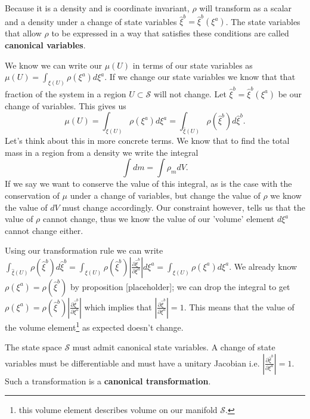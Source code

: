 \documentclass{article}
\begin{document}

\begin{prop}
	Because it is a density and is coordinate invariant, $\rho$ will transform as a scalar and a density under a change of state variables $\hat{\xi}^b = \hat{\xi}^b(\xi^a)$. The state variables that allow $\rho$ to be expressed in a way that satisfies these conditions are called \textbf{canonical variables}.
\end{prop}


	We know we can write our $\mu(U)$ in terms of our state variables as $\mu(U) = \int_{\xi(U)} \rho(\xi^a)d\xi^a$. If we change our state variables we know that that fraction of the system in a region $U \subset \mathcal{S}$ will not change. Let $\hat{\xi}^b = \hat{\xi}^b(\xi^a)$ be our change of variables. This gives us $$\mu(U) = \int_{\xi(U)} \rho(\xi^a)d\xi^a = \int_{\hat{\xi}(U)} \rho(\hat{\xi}^b)d\hat{\xi}^b.$$ Let's think about this in more concrete terms. We know that to find the total mass in a region from a density we write the integral $$\int dm = \int \rho_m dV.$$ If we say we want to conserve the value of this integral, as is the case with the conservation of $\mu$ under a change of variables, but change the value of $\rho$ we know the value of $dV$ must change accordingly. Our constraint however, tells us that the value of $\rho$ cannot change, thus we know the value of our 'volume' element $d\xi^a$ cannot change either.
	
	Using our transformation rule we can write $\int_{\hat{\xi}(U)} \rho(\hat{\xi}^b)d\hat{\xi}^b = \int_{\xi(U)} \rho(\hat{\xi}^b)\left|\frac{\partial\hat{\xi}^b}{\partial\xi^a}\right|d\xi^a = \int_{\xi(U)} \rho(\xi^a)d\xi^a$. We already know $\rho(\xi^a) = \rho(\hat{\xi}^b)$ by proposition [placeholder]; we can drop the integral to get $\rho(\xi^a) = \rho(\hat{\xi}^b)\left|\frac{\partial\hat{\xi}^b}{\partial\xi^a}\right|$ which implies that $\left|\frac{\partial\hat{\xi}^b}{\partial\xi^a}\right| = 1$. This means that the value of the volume element\footnote{this volume element describes volume on our manifold $\mathcal{S}$.} as expected doesn't change.
	
\begin{prop}
	The state space $\mathcal{S}$ must admit canonical state variables. A change of state variables must be differentiable and must have a unitary Jacobian i.e. $\left|\frac{\partial\hat{\xi}^b}{\partial\xi^a}\right| = 1$. Such a transformation is a \textbf{canonical transformation}.
\end{prop}
\end{document}
